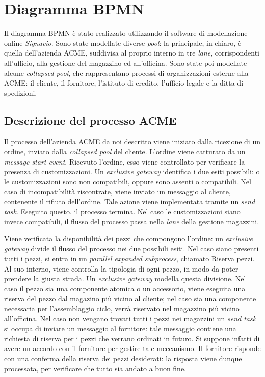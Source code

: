 \section{Diagramma BPMN}
Il diagramma BPMN \`e stato realizzato utilizzando il software di
modellazione online \textit{Signavio}.
Sono state modellate diverse \textit{pool}: la principale, in chiaro,
\`e quella dell'azienda ACME, suddivisa al proprio interno in tre
\textit{lane}, corrispondenti all'ufficio, alla gestione del magazzino
ed all'officina.
Sono state poi modellate alcune \textit{collapsed pool}, che
rappresentano processi di organizzazioni esterne alla ACME: il cliente,
il fornitore, l'istituto di credito, l'ufficio legale e la ditta di
spedizioni.

\subsection{Descrizione del processo ACME}
Il processo dell'azienda ACME da noi descritto viene iniziato dalla
ricezione di un ordine, inviato dalla \textit{collapsed pool} del
cliente.
L'ordine viene catturato da un \textit{message start event}.
Ricevuto l'ordine, esso viene controllato per verificare la presenza di
customizzazioni. Un \textit{exclusive gateway} identifica i due esiti
possibili: o le customizzazioni sono non compatibili, oppure sono
assenti o compatibili.
Nel caso di incompatibilit\`a riscontrate, viene inviato un messaggio al
cliente, contenente il rifiuto dell'ordine. Tale azione viene
implementata tramite un \textit{send task}. Eseguito questo, il processo
termina.
Nel caso le customizzazioni siano invece compatibili, il flusso del
processo passa nella \textit{lane} della gestione magazzini.

Viene verificata la disponibilit\`a dei pezzi che compongono l'ordine:
un \textit{exclusive gateway} divide il flusso del processo nei due
possibili esiti.
Nel caso siano presenti tutti i pezzi, si entra in un
\textit{parallel expanded subprocess}, chiamato Riserva pezzi. Al suo
interno, viene controlla la tipologia di ogni pezzo, in modo da poter
prendere la giusta strada. Un \textit{exclusive gateway} modella questa
divisione. Nel caso il pezzo sia una componente atomica o un accessorio,
viene eseguita una riserva del pezzo dal magazino pi\`u vicino al
cliente; nel caso sia una componente necessaria per l'assemblaggio
ciclo, verr\`a riservato nel magazzino pi\`u vicino all'officina.
Nel caso non vengano trovati tutti i pezzi nei magazzini un
\textit{send task} si occupa di inviare un messaggio al fornitore: tale
messaggio contiene una richiesta di riserva per i pezzi che verrano
ordinati in futuro. Si suppone infatti di avere un accordo con il
fornitore per gestire tale meccanismo.
Il fornitore risponde con una conferma della riserva dei pezzi
desiderati: la risposta viene dunque processata, per verificare che
tutto sia andato a buon fine.

